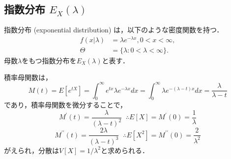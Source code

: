\documentclass{jsreport}
\begin{document}
\subsection{指数分布 $E_X(\lambda)$}
指数分布 (exponential distribution) は，以下のような密度関数を持つ．
\begin{align}
  f(x|\lambda) &= \lambda e^{-\lambda x}, 0 < x < \infty, \nonumber \\
  \Theta &= \{\lambda : 0 < \lambda < \infty\}. \nonumber
\end{align}
母数$\lambda$をもつ指数分布を$E_X(\lambda)$と表す．

積率母関数は，
\begin{equation}
  M(t) = E[e^{tX}] = \int_0^{\infty} e^{tx}\lambda e^{-\lambda x} dx = \int_0^{\infty} \lambda e^{-(\lambda - t)x} dx = \frac{\lambda}{\lambda - t} \nonumber
\end{equation}
であり，積率母関数を微分することで，
\begin{equation}
  M^{\prime}(t) = \frac{\lambda}{(\lambda - t)^2} \; \; \therefore E[X] = M^{\prime}(0) = \frac{1}{\lambda} \nonumber
\end{equation}
\begin{equation}
  M^{\prime \prime} (t) = \frac{2 \lambda}{(\lambda - t)^3} \; \; \therefore E[X^2] = M^{\prime \prime}(0) = \frac{2}{\lambda^2} \nonumber
\end{equation}
がえられ，分散は$V[X] = 1/\lambda^2$と求められる．
\end{document}

